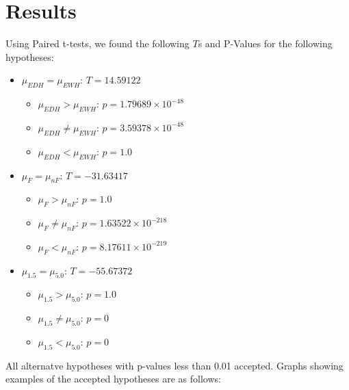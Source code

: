 \documentclass{article}
\begin{document}
\section*{Results}
Using Paired t-tests, we found the following $T$s and P-Values for the following hypotheses:
\begin{itemize}
  \item $\mu_{EDH}=\mu_{EWH}$: $T=14.59122$
  \begin{itemize}
    \item $\mu_{EDH}>\mu_{EWH}$: $p=1.79689\times10^{-48}$
    \item $\mu_{EDH}\neq\mu_{EWH}$: $p=3.59378\times10^{-48}$
    \item $\mu_{EDH}<\mu_{EWH}$: $p=1.0$
  \end{itemize}  
  \item $\mu_{F}=\mu_{nF}$: $T=-31.63417$
  \begin{itemize}
    \item $\mu_{F}>\mu_{nF}$: $p=1.0$
    \item $\mu_{F}\neq\mu_{nF}$: $p=1.63522\times10^{-218}$
    \item $\mu_{F}<\mu_{nF}$: $p=8.17611\times10^{-219}$
  \end{itemize}
  \item $\mu_{1.5}=\mu_{5.0}$: $T=-55.67372$
  \begin{itemize}
    \item $\mu_{1.5}>\mu_{5.0}$: $p=1.0$
    \item $\mu_{1.5}\neq\mu_{5.0}$: $p=0$
    \item $\mu_{1.5}<\mu_{5.0}$: $p=0$
  \end{itemize}
\end{itemize}

All alternatve hypotheses with p-values less than 0.01 accepted. Graphs showing examples of the accepted hypotheses are as follows:
\end{document}

